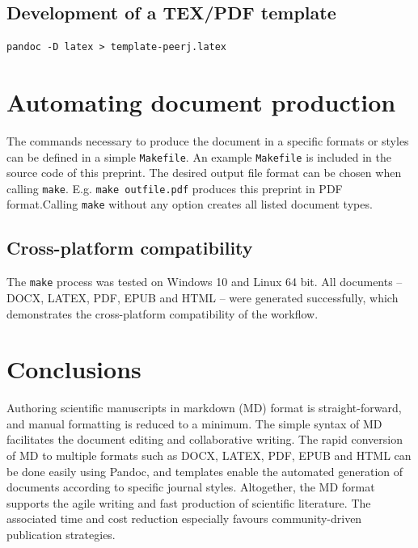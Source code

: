 \documentclass[10pt,fleqn]{wlpeerj}
\begin{document}
\subsection{Development
of a
TEX/PDF
template}\label{development-of-a-texpdf-template}

\begin{verbatim}
pandoc -D latex > template-peerj.latex
\end{verbatim}

\section{Automating
document
production}\label{automating-document-production}

The
commands
necessary
to
produce
the
document
in a
specific
formats
or
styles
can
be
defined
in a
simple
\texttt{Makefile}.
An
example
\texttt{Makefile}
is
included
in
the
source
code
of
this
preprint.
The
desired
output
file
format
can
be
chosen
when
calling
\texttt{make}.
E.g.
\texttt{make\ outfile.pdf}
produces
this
preprint
in
PDF
format.Calling
\texttt{make}
without
any
option
creates
all
listed
document
types.

\subsection{Cross-platform
compatibility}\label{cross-platform-compatibility}

The
\texttt{make}
process
was
tested
on
Windows
10
and
Linux
64
bit.
All
documents
--
DOCX,
LATEX,
PDF,
EPUB
and
HTML
--
were
generated
successfully,
which
demonstrates
the
cross-platform
compatibility
of
the
workflow.

\section{Conclusions}\label{conclusions}

Authoring
scientific
manuscripts
in
markdown
(MD)
format
is
straight-forward,
and
manual
formatting
is
reduced
to a
minimum.
The
simple
syntax
of MD
facilitates
the
document
editing
and
collaborative
writing.
The
rapid
conversion
of MD
to
multiple
formats
such
as
DOCX,
LATEX,
PDF,
EPUB
and
HTML
can
be
done
easily
using
Pandoc,
and
templates
enable
the
automated
generation
of
documents
according
to
specific
journal
styles.
Altogether,
the
MD
format
supports
the
agile
writing
and
fast
production
of
scientific
literature.
The
associated
time
and
cost
reduction
especially
favours
community-driven
publication
strategies.
\end{document}
